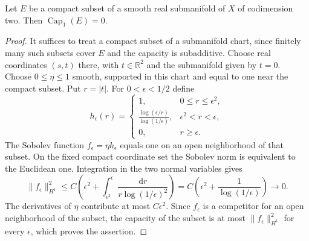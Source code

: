\begin{lemma}\label{hessian:sobolev-codimension-two}
Let $E$ be a compact subset of a smooth real submanifold of $X$ of
codimension two. Then $\operatorname{Cap}_1(E)=0$.
\end{lemma}
\begin{proof}
It suffices to treat a compact subset of a submanifold chart, since
finitely many such subsets cover $E$ and the capacity is subadditive.
Choose real coordinates $(s,t)$ there, with $t\in\mathbb R^2$ and the
submanifold given by $t=0$. Choose $0\leq\eta\leq1$ smooth,
supported in this chart and equal to one near the compact subset.
Put $r=|t|$.
For $0<\epsilon<1/2$ define
\[
 h_\epsilon(r)=
 \begin{cases}
  1,&0\leq r\leq\epsilon^2,\\
  \displaystyle\frac{\log(\epsilon/r)}{\log(1/\epsilon)},
       &\epsilon^2<r<\epsilon,\\
  0,&r\geq\epsilon.
 \end{cases}
\]
The Sobolev function $f_\epsilon=\eta h_\epsilon$ equals one on an
open neighborhood of that subset. On the fixed compact coordinate
set the Sobolev norm is equivalent to the Euclidean one. Integration
in the two normal variables gives
\[
 \|f_\epsilon\|_{H^1}^2
 \leq C\left(\epsilon^2+
     \int_{\epsilon^2}^{\epsilon}
       \frac{\mathrm dr}{r\log(1/\epsilon)^2}\right)
 =C\left(\epsilon^2+\frac1{\log(1/\epsilon)}\right)
 \longrightarrow0.
\]
The derivatives of $\eta$ contribute at most $C\epsilon^2$.
Since $f_\epsilon$ is a competitor for an open neighborhood of the
subset, the capacity of the subset is at most
$\|f_\epsilon\|_{H^1}^2$ for every $\epsilon$, which proves the
assertion.
\end{proof}

